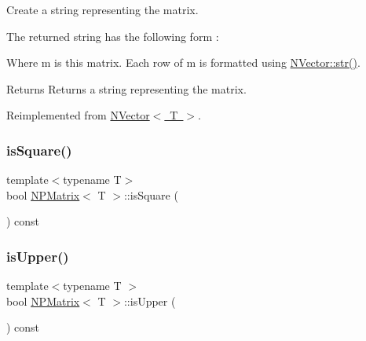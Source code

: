 Create a string representing the matrix. 

The returned string has the following form \+:


\begin{DoxyCode}{0}
\end{DoxyCode}
 Where {\ttfamily m} is {\ttfamily this} matrix. Each row of {\ttfamily m} is formatted using {\ttfamily \mbox{\hyperlink{class_n_vector_a6d66b06b953197c1b3965ed69f9fd17e}{N\+Vector\+::str()}}}.

\begin{DoxyReturn}{Returns}
Returns a string representing the matrix. 
\end{DoxyReturn}


Reimplemented from \mbox{\hyperlink{class_n_vector_a6d66b06b953197c1b3965ed69f9fd17e}{N\+Vector$<$ T $>$}}.

\mbox{\label{class_n_p_matrix_af4d13e966823c2e132461df6b1ed7602}} 
\subsubsection{\texorpdfstring{isSquare()}{isSquare()}}
{\footnotesize\ttfamily template$<$typename T$>$ \\
bool \mbox{\hyperlink{class_n_p_matrix}{N\+P\+Matrix}}$<$ T $>$\+::is\+Square (\begin{DoxyParamCaption}{ }\end{DoxyParamCaption}) const\hspace{0.3cm}{\ttfamily [inline]}}

\mbox{\label{class_n_p_matrix_aa1baeec21546add3c67f0d330c9d0016}} 
\subsubsection{\texorpdfstring{isUpper()}{isUpper()}}
{\footnotesize\ttfamily template$<$typename T $>$ \\
bool \mbox{\hyperlink{class_n_p_matrix}{N\+P\+Matrix}}$<$ T $>$\+::is\+Upper (\begin{DoxyParamCaption}{ }\end{DoxyParamCaption}) const}

